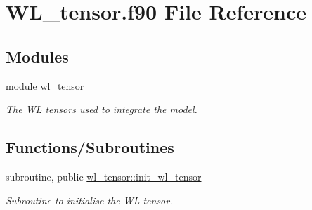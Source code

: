 \hypertarget{WL__tensor_8f90}{}\section{W\+L\+\_\+tensor.\+f90 File Reference}
\label{WL__tensor_8f90}
\subsection*{Modules}
\begin{DoxyCompactItemize}
\item 
module \hyperlink{namespacewl__tensor}{wl\+\_\+tensor}
\begin{DoxyCompactList}\small\item\em The WL tensors used to integrate the model. \end{DoxyCompactList}\end{DoxyCompactItemize}
\subsection*{Functions/\+Subroutines}
\begin{DoxyCompactItemize}
\item 
subroutine, public \hyperlink{namespacewl__tensor_a7879231bc9a7529024797ff81ade5fc3}{wl\+\_\+tensor\+::init\+\_\+wl\+\_\+tensor}
\begin{DoxyCompactList}\small\item\em Subroutine to initialise the WL tensor. \end{DoxyCompactList}\end{DoxyCompactItemize}
